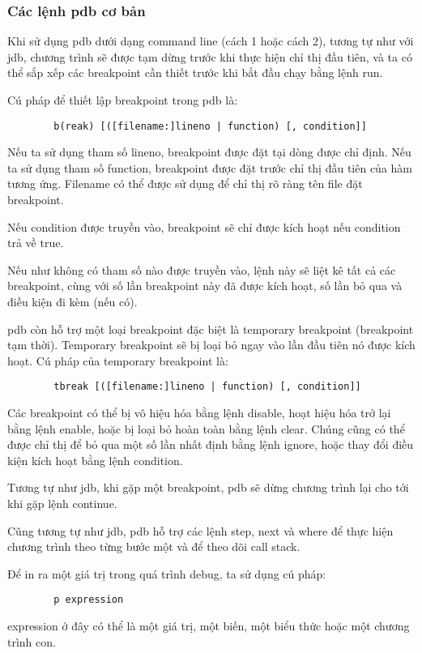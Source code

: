 \documentclass{article}
\begin{document}
    \subsubsection{Các lệnh pdb cơ bản}
    Khi sử dụng pdb dưới dạng command line (cách 1 hoặc cách 2), tương tự như với jdb, chương trình
    sẽ được tạm dừng trước khi thực hiện chỉ thị đầu tiên, và ta có thể sắp xếp các breakpoint cần
    thiết trước khi bắt đầu chạy bằng lệnh run.

    Cú pháp để thiết lập breakpoint trong pdb là:
    \begin{verbatim}
        b(reak) [([filename:]lineno | function) [, condition]]
    \end{verbatim}
    Nếu ta sử dụng tham số lineno, breakpoint được đặt tại dòng được chỉ định. Nếu ta sử dụng tham 
    số function, breakpoint được đặt trước chỉ thị đầu tiên của hàm tương ứng. Filename có thể được
    sử dụng để chỉ thị rõ ràng tên file đặt breakpoint.
    
    Nếu condition được truyền vào, breakpoint sẽ chỉ được kích hoạt nếu condition trả về true.

    Nếu như không có tham số nào được truyền vào, lệnh này sẽ liệt kê tất cả các breakpoint, cùng với
    số lần breakpoint này đã được kích hoạt, số lần bỏ qua và điều kiện đi kèm (nếu có).

    pdb còn hỗ trợ một loại breakpoint đặc biệt là temporary breakpoint (breakpoint tạm thời). 
    Temporary breakpoint sẽ bị loại bỏ ngay vào lần đầu tiên nó được kích hoạt. Cú pháp của temporary
    breakpoint là:
    \begin{verbatim}
        tbreak [([filename:]lineno | function) [, condition]]
    \end{verbatim}

    Các breakpoint có thể bị vô hiệu hóa bằng lệnh disable, hoạt hiệu hóa trở lại bằng lệnh enable, 
    hoặc bị loại bỏ hoàn toàn bằng lệnh clear. Chúng cũng có thể được chỉ thị để bỏ qua một số lần 
    nhất định bằng lệnh ignore, hoặc thay đổi điều kiện kích hoạt bằng lệnh condition.

    Tương tự như jdb, khi gặp một breakpoint, pdb sẽ dừng chương trình lại cho tới khi gặp lệnh
    continue.

    Cũng tương tự như jdb, pdb hỗ trợ các lệnh step, next và where để thực hiện chương trình theo 
    từng bước một và để theo dõi call stack.

    Để in ra một giá trị trong quá trình debug, ta sử dụng cú pháp:
    \begin{verbatim}
        p expression
    \end{verbatim}
    expression ở đây có thể là một giá trị, một biến, một biểu thức hoặc một chương trình con.
\end{document}
